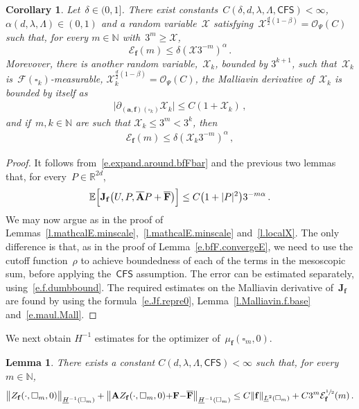 \documentclass[11pt]{article} %
\let\oldsquare\square %
\renewcommand{\square}{\oldsquare}
\numberwithin{equation}{section}
\newtheorem{corollary}[theorem]{Corollary}
\newtheorem{lemma}[theorem]{Lemma}
\theoremstyle{definition}
\newcommand*{\N}{\ensuremath{\mathbb{N}}}
\newcommand*{\R}{\ensuremath{\mathbb{R}}}
\newcommand{\f}{\mathbf{f}}
\renewcommand{\a}{\mathbf{a}}
\newcommand{\cu}{\square}
\newcommand{\F}{\mathcal{F}}
\newcommand{\E}{\mathbb{E}}
\newcommand{\X}{\mathcal{X}}
\renewcommand{\O}{\mathcal{O}}
\newcommand{\CFS}{\mathsf{CFS}}
\newcommand{\bfA}{\mathbf{A}}
\newcommand{\bfAhom}{\overline{\mathbf{A}}}
\newcommand{\bfJ}{\mathbf{J}}
\newcommand{\bfF}{\mathbf{F}}
\begin{document}
\begin{corollary}
\label{c.Jf.minsetE}
Let~$\delta \in (0,1]$. 
There exist constants~$C(\delta,d,\lambda,\Lambda,\CFS) < \infty$,~$\alpha(d,\lambda,\Lambda) \in (0,1)$ 
and a random variable~$\X$ satisfying~$\X^{\frac d2 (1-\beta)} = \O_\Psi(C)$ such that, 
for every $m\in\N$ with~$3^m\geq \X$, 
\begin{equation}
\label{e.Jf.minset.smash.again}
\mathcal{E}_\f(m) \leq  \delta (\X3^{-m})^{ \alpha} \,.
\end{equation}
Morevover, there is another random variable,~$\X_{k}$, bounded by $3^{k+1}$, such that~$\X_{k}$ is~$\F(\cu_k)$-measurable, $\X_k^{\frac d2 (1-\beta)} = \O_{\Psi}(C)$, the Malliavin derivative of~$\X_{k}$ is bounded by itself as
\begin{align} \label{e.f.mallliavin.local.again}
\bigl| \partial_{(\a,\f)(\cu_k)} \X_{k} \bigr| \leq C (1+\X_{k}) 
\,,
\end{align}
and if~$m,k \in \N$ are such that $\X_{k} \leq 3^m < 3^k$, then
\begin{align}
\label{e.convssmaxsmax.local.again}
\mathcal{E}_\f(m) 
\leq
\delta  (\X_{k} 3^{-m})^{ \alpha}
\,,
\end{align}
\end{corollary}
\begin{proof}
It follows from~\eqref{e.expand.around.bfFbar} and the previous two lemmas that, for every~$P\in\R^{2d}$, 
\begin{equation}
\label{e.Jf.minsetE}
\E \Bigl[\bfJ_\f \bigl(U, P, \bfAhom P+ \overline{\bfF} \bigr) \Bigr]
\leq 
C\bigl( 1+ |P|^2 \bigr) 3^{-m\alpha} 
\,.
\end{equation}
We may now argue as in the proof of Lemmas~\ref{l.mathcalE.minscale},~\ref{l.mathcalE.minscale} and~\ref{l.localX}.
The only difference is that, as in the proof of Lemma~\ref{e.bfF.convergeE},  we need to use the cutoff function~$\rho$ to achieve boundedness of each of the terms in the mesoscopic sum, before applying the~$\CFS$ assumption. The error can be estimated separately, using~\eqref{e.f.dumbbound}. 
The required estimates on the Malliavin derivative of~$\bfJ_\f$ are found by using the formula~\eqref{e.Jf.repre0}, Lemma~\ref{l.Malliavin.f.base} and~\eqref{e.maul.Mall}. 
\end{proof}


We next obtain $H^{-1}$ estimates for the optimizer of~$\mu_\f(\cu_m,0)$.   


\begin{lemma} \label{l.f.Hminusone.zero}
There exists a constant $C(d,\lambda,\Lambda,\CFS)<\infty$ such that, for every~$m \in \N$, 
\begin{equation*}  
\bigl\| Z_\f(\cdot,\cu_m,0) \bigr\|_{\underline{H}^{-1}(\cu_m)}
+
\bigl\| \bfA Z_\f(\cdot,\cu_m,0) {+} \bfF {-} \overline{\bfF} \bigr\|_{\underline{H}^{-1}(\cu_m)}
\leq 
C  \| \f \|_{\underline{L}^2(\cu_m)} + C 3^{m} \mathcal{E}_\f^{\sfrac12}(m)
\,.
\end{equation*}

\end{lemma}
\end{document}
